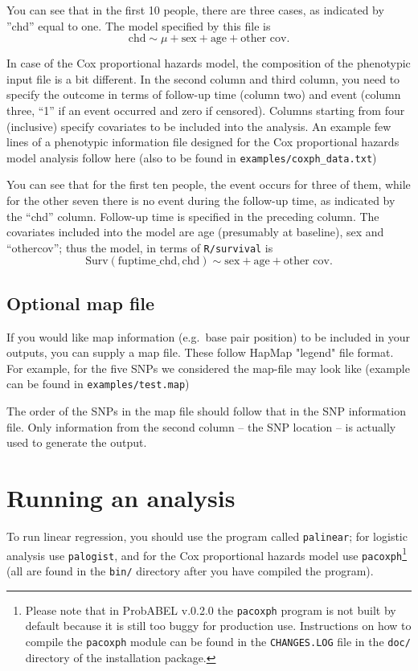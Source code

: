 \documentclass[12pt,a4paper]{article}
\begin{document}
You can see that in the first 10 people, there are three cases, as indicated
by ''chd'' equal to one. The model specified by this file
is
\begin{equation*}
\textrm{chd} \sim \mu + \textrm{sex} + \textrm{age} +
\textrm{other cov}.
\end{equation*}

In case of the Cox proportional hazards model, the composition of the
phenotypic input file is a bit different. In the second column and
third column, you need to specify the outcome in terms of follow-up
time (column two) and event (column three, ``1'' if an event occurred
and zero if censored). Columns starting from four (inclusive) specify
covariates to be included into the analysis. An example few lines of
a phenotypic information file designed for the Cox proportional hazards model
analysis follow here (also to be found in
\texttt{examples/coxph\_data.txt})



You can see that for the first ten people, the event occurs for three of
them, while for the other seven there is no event during the follow-up
time, as indicated by the ``chd'' column. Follow-up time is specified in the preceding
column. The covariates included into the model are age (presumably
at baseline), sex and ``othercov''; thus the model, in terms of
\texttt{R/survival} is
\begin{equation*}
\textrm{Surv}(\textrm{fuptime\_chd}, \textrm{chd})
\sim \textrm{sex} + \textrm{age} + \textrm{other cov}.
\end{equation*}

\subsection{Optional map file}
If you would like map information (e.g.~base pair position) to
be included in your outputs, you can supply a map file. These follow
HapMap "legend" file format. For example, for the five SNPs we considered
the map-file may look like (example can be found in
\texttt{examples/test.map})



The order of the SNPs in the map file should follow that in the SNP information
file. Only information from the second column -- the SNP location -- is
actually used to generate the output.

\section{Running an analysis}
\label{sec:runanalysis}
To run linear regression, you should use the program called
\texttt{palinear}; for logistic analysis use \texttt{palogist}, and
for the Cox proportional hazards model use
\texttt{pacoxph}\footnote{Please note that in ProbABEL v.0.2.0 the
  \texttt{pacoxph} program is not built by default because it is still
  too buggy for production use. Instructions on how to compile the
  \texttt{pacoxph} module can be found in the \texttt{CHANGES.LOG}
  file in the \texttt{doc/} directory of the installation package.}
(all are found in the \texttt{bin/} directory after you have compiled
the program).
\end{document}
